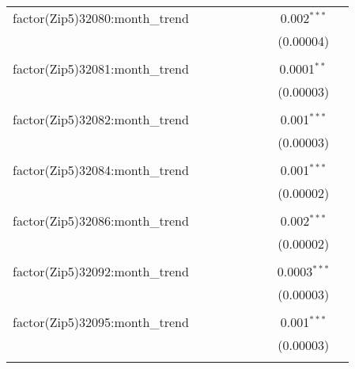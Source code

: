 \begin{table}[H]
{\begin{tabular}{@{\extracolsep{5pt}}lcccccccc}
  factor(Zip5)32080:month\_trend &  &  &  &  &  &  & 0.002$^{***}$ &  \\  

   &  &  &  &  &  &  & (0.00004) &  \\  

   & & & & & & & & \\  

  factor(Zip5)32081:month\_trend &  &  &  &  &  &  & 0.0001$^{**}$ &  \\  

   &  &  &  &  &  &  & (0.00003) &  \\  

   & & & & & & & & \\  

  factor(Zip5)32082:month\_trend &  &  &  &  &  &  & 0.001$^{***}$ &  \\  

   &  &  &  &  &  &  & (0.00003) &  \\  

   & & & & & & & & \\  

  factor(Zip5)32084:month\_trend &  &  &  &  &  &  & 0.001$^{***}$ &  \\  

   &  &  &  &  &  &  & (0.00002) &  \\  

   & & & & & & & & \\  

  factor(Zip5)32086:month\_trend &  &  &  &  &  &  & 0.002$^{***}$ &  \\  

   &  &  &  &  &  &  & (0.00002) &  \\  

   & & & & & & & & \\  

  factor(Zip5)32092:month\_trend &  &  &  &  &  &  & 0.0003$^{***}$ &  \\  

   &  &  &  &  &  &  & (0.00003) &  \\  

   & & & & & & & & \\  

  factor(Zip5)32095:month\_trend &  &  &  &  &  &  & 0.001$^{***}$ &  \\  

   &  &  &  &  &  &  & (0.00003) &  \\  

   & & & & & & & & \\  


\end{tabular}}
\end{table}
